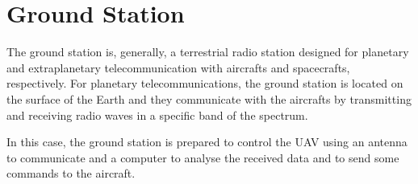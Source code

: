 \section{Ground Station}\label{sec:gs}

The ground station is, generally, a terrestrial radio station designed for planetary and extraplanetary telecommunication with aircrafts and spacecrafts, respectively. For planetary telecommunications, the ground station is located on the surface of the Earth and they communicate with the aircrafts by transmitting and receiving radio waves in a specific band of the spectrum.

In this case, the ground station is prepared to control the UAV using an antenna to communicate and a computer to analyse the received data and to send some commands to the aircraft.